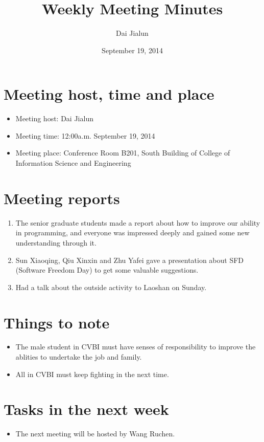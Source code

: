 \documentclass[a4paper，12pt]{article}
\title{Weekly Meeting Minutes}
\author{Dai Jialun}
\date{September 19, 2014}
\begin{document}
\maketitle

\section{Meeting host, time and place}

\begin{itemize}
\item Meeting host: Dai Jialun
\item Meeting time: 12:00a.m. September 19, 2014 
\item Meeting place: Conference Room B201, South Building of College of Information Science and Engineering 
\end{itemize}

\section{Meeting reports}

\begin{enumerate}
\item The senior graduate students made a report about how to improve our ability in programming, and everyone was impressed deeply and gained some new understanding through it. 
\item Sun Xiaoqing, Qiu Xinxin and Zhu Yafei gave a presentation about SFD (Software Freedom Day) to get some valuable suggestions.
\item Had a talk about the outside activity to Laoshan on Sunday. 
\end{enumerate}

\section {Things to note}

\begin{itemize}
\item The male student in CVBI must have senses of responsibility to improve the ablities to undertake the job and family.
\item All in CVBI must keep fighting in the next time.
\end{itemize}

\section {Tasks in the next week }

\begin{itemize}
\item The next meeting will be hosted by Wang Ruchen.
\end{itemize}
\end{document}
